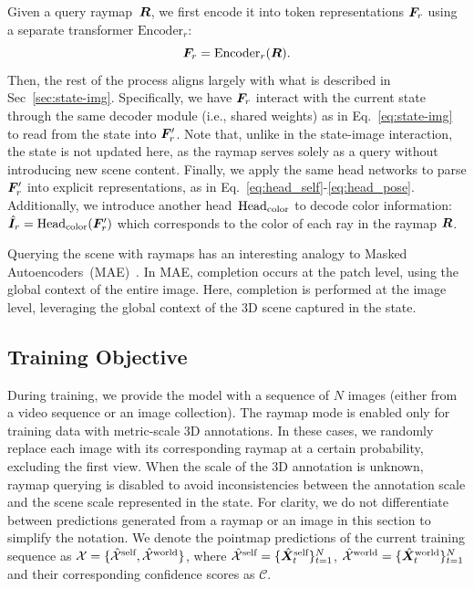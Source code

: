 Given a query raymap~$\bm R$, we first encode it into token representations $\bm{F}_r$ using a separate transformer %
$\mathrm{Encoder}_r$:
\begin{equation}
    \bm{F}_r = \mathrm{Encoder}_r(\bm R).
\end{equation}
Then, the rest of the process aligns largely with what is described in Sec~\ref{sec:state-img}. Specifically, we have
$\bm{F}_r$ interact with the current state through the same decoder module (i.e., shared weights) as in Eq.~\ref{eq:state-img} to read from the state into 
$\bm{F}_r'$. Note that, unlike in the state-image interaction, the state is not updated here, as the raymap serves solely as a query without introducing new scene content. 
Finally, we apply the same head networks to parse 
$\bm{F}_r'$ into explicit representations, as in Eq.~\ref{eq:head_self}-\ref{eq:head_pose}. Additionally, we introduce another head~$\mathrm{Head}_\text{color}$ to decode color information: $ \hat{\bm I}_r = \mathrm{Head}_\text{color}(\bm{F}_r')$ which corresponds to the color of each ray in the raymap $\bm R$.

Querying the scene with raymaps has an interesting analogy to Masked Autoencoders~(MAE)~\cite{he2022masked}. In MAE, completion occurs at the patch level, using the global context of the entire image. Here, completion is performed at the image level, leveraging the global context of the 3D scene captured in the state. %

\subsection{Training Objective}
During training, we provide the model with a sequence of $N$ images (either from a video sequence or an image collection). The raymap mode is enabled only for training data with metric-scale 3D annotations. In these cases, we randomly replace each image with its corresponding raymap at a certain probability, excluding the first view. When the scale of the 3D annotation is unknown, raymap querying is disabled to avoid inconsistencies between the annotation scale and the scene scale represented in the state.  For clarity, we do not differentiate between predictions generated from a raymap or an image in this section to simplify the notation. 
We denote the pointmap predictions of the current training sequence as $\mathcal{X} = \{\mathcal{\hat{X}}^\text{self}, \mathcal{\hat{X}}^\text{world}\}$, where
$\mathcal{\hat{X}}^\text{self}=\{\hat{\bm X}_t^\text{self}\}_{t=1}^N$, $\mathcal{\hat{X}}^\text{world}=\{\hat{\bm X}_t^\text{world}\}_{t=1}^N$ and their corresponding confidence scores as $\mathcal{C}$.

\vspace{-0.5em}

